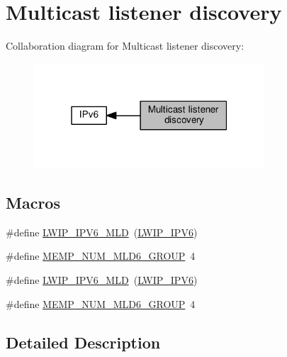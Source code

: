\hypertarget{group__lwip__opts__mld6}{}\section{Multicast listener discovery}
\label{group__lwip__opts__mld6}
Collaboration diagram for Multicast listener discovery\+:
\nopagebreak
\begin{figure}[H]
\begin{center}
\leavevmode
\includegraphics[width=244pt]{group__lwip__opts__mld6}
\end{center}
\end{figure}
\subsection*{Macros}
\begin{DoxyCompactItemize}
\item 
\#define \hyperlink{group__lwip__opts__mld6_ga44d8f24eaebbc50221ac1336212a3528}{L\+W\+I\+P\+\_\+\+I\+P\+V6\+\_\+\+M\+LD}~(\hyperlink{openmote-cc2538_2lwip_2test_2fuzz_2lwipopts_8h_a872e3bb3fe2212156d66b18fccc9643f}{L\+W\+I\+P\+\_\+\+I\+P\+V6})
\item 
\#define \hyperlink{group__lwip__opts__mld6_ga89e92d8de8898696e797f13fdd169494}{M\+E\+M\+P\+\_\+\+N\+U\+M\+\_\+\+M\+L\+D6\+\_\+\+G\+R\+O\+UP}~4
\item 
\#define \hyperlink{group__lwip__opts__mld6_ga44d8f24eaebbc50221ac1336212a3528}{L\+W\+I\+P\+\_\+\+I\+P\+V6\+\_\+\+M\+LD}~(\hyperlink{openmote-cc2538_2lwip_2test_2fuzz_2lwipopts_8h_a872e3bb3fe2212156d66b18fccc9643f}{L\+W\+I\+P\+\_\+\+I\+P\+V6})
\item 
\#define \hyperlink{group__lwip__opts__mld6_ga89e92d8de8898696e797f13fdd169494}{M\+E\+M\+P\+\_\+\+N\+U\+M\+\_\+\+M\+L\+D6\+\_\+\+G\+R\+O\+UP}~4
\end{DoxyCompactItemize}


\subsection{Detailed Description}


